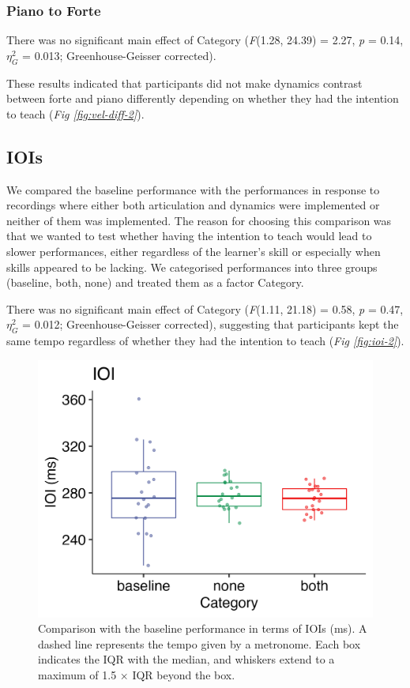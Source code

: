 \documentclass[
  man,floatsintext]{apa6}
\begin{document}
\hypertarget{piano-to-forte-1}{%
\subsubsection{Piano to Forte}\label{piano-to-forte-1}}

There was no significant main effect of Category (\emph{F}(1.28, 24.39) = 2.27, \emph{p} = 0.14, \(\eta_G^2\) = 0.013; Greenhouse-Geisser corrected).

These results indicated that participants did not make dynamics contrast between forte and piano differently depending on whether they had the intention to teach (\emph{Fig \ref{fig:vel-diff-2}}).

\hypertarget{iois-1}{%
\subsection{IOIs}\label{iois-1}}

We compared the baseline performance with the performances in response to recordings where either both articulation and dynamics were implemented or neither of them was implemented. The reason for choosing this comparison was that we wanted to test whether having the intention to teach would lead to slower performances, either regardless of the learner's skill or especially when skills appeared to be lacking. We categorised performances into three groups (baseline, both, none) and treated them as a factor Category.

There was no significant main effect of Category (\emph{F}(1.11, 21.18) = 0.58, \emph{p} = 0.47, \(\eta_G^2\) = 0.012; Greenhouse-Geisser corrected), suggesting that participants kept the same tempo regardless of whether they had the intention to teach (\emph{Fig \ref{fig:ioi-2}}).

\begin{figure}
\includegraphics[width=1\linewidth]{manuscript_files/figure-latex/plot-ioi-2-1} \caption{\label{fig:ioi-2}Comparison with the baseline performance in terms of IOIs (ms). A dashed line represents the tempo given by a metronome. Each box indicates the IQR with the median, and whiskers extend to a maximum of 1.5 × IQR beyond the box.}\label{fig:plot-ioi-2}
\end{figure}
\end{document}
